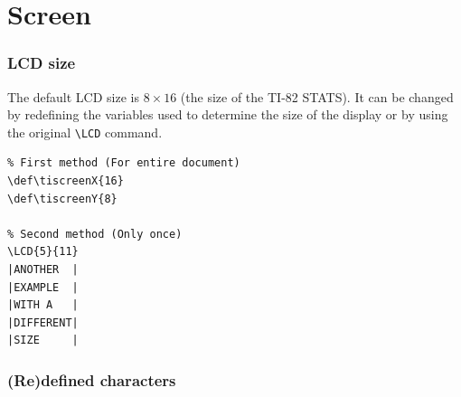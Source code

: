 \documentclass[a4paper,12pt]{article}
\begin{document}
\clearpage\part{Screen}

\section{LCD size}

The default LCD size is $8 \times 16$ (the size of the TI-82 STATS). It can be
changed by redefining the variables used to determine the size of the display
or by using the original \verb|\LCD| command.

\begin{Verbatim}
% First method (For entire document)
\def\tiscreenX{16}
\def\tiscreenY{8}

% Second method (Only once)
\LCD{5}{11}
|ANOTHER  |
|EXAMPLE  |
|WITH A   |
|DIFFERENT|
|SIZE     |
\end{Verbatim}

\section{(Re)defined characters} 
\end{document}
